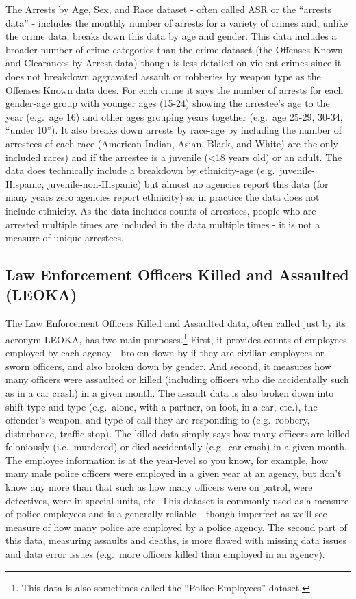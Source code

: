 \documentclass[
  12pt,
  openany]{book}
\begin{document}
The Arrests by Age, Sex, and Race dataset - often called ASR or the ``arrests data'' - includes the monthly number of arrests for a variety of crimes and, unlike the crime data, breaks down this data by age and gender. This data includes a broader number of crime categories than the crime dataset (the Offenses Known and Clearances by Arrest data) though is less detailed on violent crimes since it does not breakdown aggravated assault or robberies by weapon type as the Offenses Known data does. For each crime it says the number of arrests for each gender-age group with younger ages (15-24) showing the arrestee's age to the year (e.g.~age 16) and other ages grouping years together (e.g.~age 25-29, 30-34, ``under 10''). It also breaks down arrests by race-age by including the number of arrestees of each race (American Indian, Asian, Black, and White) are the only included races) and if the arrestee is a juvenile (\textless18 years old) or an adult. The data does technically include a breakdown by ethnicity-age (e.g.~juvenile-Hispanic, juvenile-non-Hispanic) but almost no agencies report this data (for many years zero agencies report ethnicity) so in practice the data does not include ethnicity. As the data includes counts of arrestees, people who are arrested multiple times are included in the data multiple times - it is not a measure of unique arrestees.

\hypertarget{law-enforcement-officers-killed-and-assaulted-leoka}{%
\subsection{Law Enforcement Officers Killed and Assaulted (LEOKA)}\label{law-enforcement-officers-killed-and-assaulted-leoka}}

The Law Enforcement Officers Killed and Assaulted data, often called just by its acronym LEOKA, has two main purposes.\footnote{This data is also sometimes called the ``Police Employees'' dataset.} First, it provides counts of employees employed by each agency - broken down by if they are civilian employees or sworn officers, and also broken down by gender. And second, it measures how many officers were assaulted or killed (including officers who die accidentally such as in a car crash) in a given month. The assault data is also broken down into shift type and type (e.g.~alone, with a partner, on foot, in a car, etc.), the offender's weapon, and type of call they are responding to (e.g.~robbery, disturbance, traffic stop). The killed data simply says how many officers are killed feloniously (i.e.~murdered) or died accidentally (e.g.~car crash) in a given month. The employee information is at the year-level so you know, for example, how many male police officers were employed in a given year at an agency, but don't know any more than that such as how many officers were on patrol, were detectives, were in special units, etc. This dataset is commonly used as a measure of police employees and is a generally reliable - though imperfect as we'll see - measure of how many police are employed by a police agency. The second part of this data, measuring assaults and deaths, is more flawed with missing data issues and data error issues (e.g.~more officers killed than employed in an agency).
\end{document}
